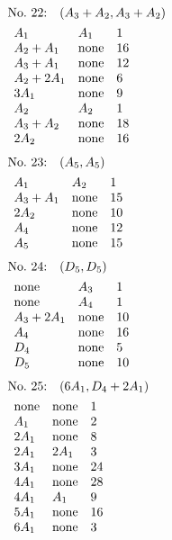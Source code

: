 %
%
\begin{align*}
&\hbox to 4cm {\textrm{No.~22:}\quad$(A_{3}+A_{2}, A_{3}+A_{2})$\hss}\\ 
&\begin{array}{lll}
A_{1} & A_{1} & 1\\
A_{2}+A_{1} & \none & 16\\
A_{3}+A_{1} & \none & 12\\
A_{2}+2A_{1} & \none & 6\\
3A_{1} & \none & 9\\
A_{2} & A_{2} & 1\\
A_{3}+A_{2} & \none & 18\\
2A_{2} & \none & 16\\
\end{array}
\end{align*}
%
%
\begin{align*}
&\hbox to 4cm {\textrm{No.~23:}\quad$(A_{5}, A_{5})$\hss}\\ 
&\begin{array}{lll}
A_{1} & A_{2} & 1\\
A_{3}+A_{1} & \none & 15\\
2A_{2} & \none & 10\\
A_{4} & \none & 12\\
A_{5} & \none & 15\\
\end{array}
\end{align*}
%
%
\begin{align*}
&\hbox to 4cm {\textrm{No.~24:}\quad$(D_{5}, D_{5})$\hss}\\ 
&\begin{array}{lll}
\none & A_{3} & 1\\
\none & A_{4} & 1\\
A_{3}+2A_{1} & \none & 10\\
A_{4} & \none & 16\\
D_{4} & \none & 5\\
D_{5} & \none & 10\\
\end{array}
\end{align*}
%
%
\begin{align*}
&\hbox to 4cm {\textrm{No.~25:}\quad$(6A_{1}, D_{4}+2A_{1})$\hss}\\ 
&\begin{array}{lll}
\none & \none & 1\\
A_{1} & \none & 2\\
2A_{1} & \none & 8\\
2A_{1} & 2A_{1} & 3\\
3A_{1} & \none & 24\\
4A_{1} & \none & 28\\
4A_{1} & A_{1} & 9\\
5A_{1} & \none & 16\\
6A_{1} & \none & 3\\
\end{array}
\end{align*}
